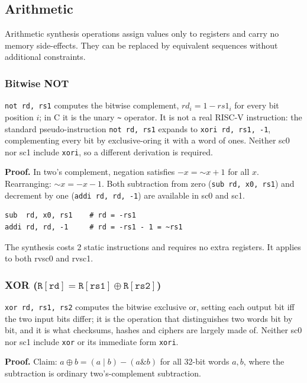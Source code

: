 \subsection{Arithmetic}

Arithmetic synthesis operations assign values only to registers and carry no memory side-effects. They
can be replaced by equivalent sequences without additional constraints.

\subsubsection{Bitwise NOT} \label{sec:sc1-not}

\texttt{not rd, rs1} computes the bitwise complement, $\mathit{rd}_i = 1 - \mathit{rs1}_i$ for
every bit position $i$; in C it is the unary \texttt{\~{}} operator. It is not a real RISC-V
instruction: the standard pseudo-instruction \texttt{not rd, rs1} expands to
\texttt{xori rd, rs1, -1}, complementing every bit by exclusive-oring it with a word of ones.
Neither sc0 nor sc1 include \texttt{xori}, so a different derivation is required.

\textbf{Proof.} In two's complement, negation satisfies $-x = \mathord{\sim}x + 1$ for all $x$.
Rearranging: $\mathord{\sim}x = -x - 1$. Both subtraction from zero (\texttt{sub rd, x0, rs1}) and
decrement by one (\texttt{addi rd, rd, -1}) are available in sc0 and sc1.

\begin{lstlisting}
sub  rd, x0, rs1    # rd = -rs1
addi rd, rd, -1     # rd = -rs1 - 1 = ~rs1
\end{lstlisting}

The synthesis costs 2 static instructions and requires no extra registers. It applies to both rvsc0
and rvsc1.

\subsubsection{XOR ($\mathtt{R[rd] = R[rs1] \oplus R[rs2]}$)} \label{sec:sc1-xor}

\texttt{xor rd, rs1, rs2} computes the bitwise exclusive or, setting each output bit iff the two
input bits differ; it is the operation that distinguishes two words bit by bit, and it is what
checksums, hashes and ciphers are largely made of. Neither sc0 nor sc1 include \texttt{xor} or its
immediate form \texttt{xori}.

\textbf{Proof.} Claim: $a \oplus b = (a \mid b) - (a \mathbin{\&} b)$ for all 32-bit words $a, b$,
where the subtraction is ordinary two's-complement subtraction.

